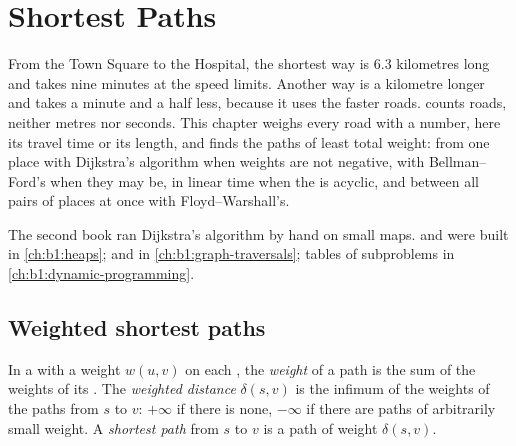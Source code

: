 \chapter{Shortest Paths}\label{ch:b1:shortest-paths}

From the Town Square to the Hospital, the shortest way is 6.3 kilometres long and takes nine minutes at the speed
limits. Another way is a kilometre longer and takes a minute and a half less, because it uses the faster roads.
 counts roads, neither metres nor seconds. This chapter weighs every road with a number, here its
travel time or its length, and finds the paths of least total weight: from one place with Dijkstra's algorithm when
weights are not negative, with Bellman--Ford's when they may be, in linear time when the  is acyclic, and between
all pairs of places at once with Floyd--Warshall's.

\begin{recall}
The second book ran Dijkstra's algorithm by hand on small maps.  and  were built in
\cref{ch:b1:heaps};  and  in \cref{ch:b1:graph-traversals}; tables of
subproblems in \cref{ch:b1:dynamic-programming}.
\end{recall}

\section{Weighted shortest paths}\label{sec:b1:shortest-paths:weighted}

\begin{definition}\label{def:b1:shortest-paths:shortest}
In a  with a weight $w(u, v)$ on each , the \emph{weight} of a path is the sum of the weights of its
. The \emph{weighted distance} $\delta(s, v)$ is the infimum of the weights of the paths
from $s$ to $v$: $+\infty$ if there is none, $-\infty$ if there are paths of arbitrarily small weight. A
\emph{shortest path} from $s$ to $v$ is a path of weight $\delta(s, v)$.
\end{definition}

